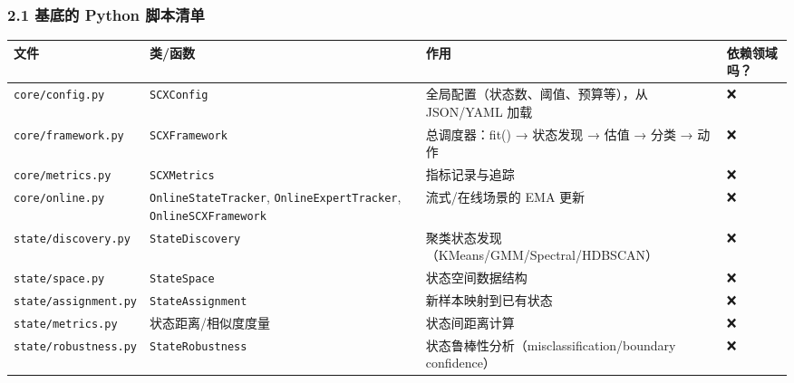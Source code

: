 \documentclass[
  12pt,
]{ctexart}
\begin{document}
\subsubsection{2.1 基底的 Python
脚本清单}\label{ux57faux5e95ux7684-python-ux811aux672cux6e05ux5355}

\begin{longtable}[]{@{}
  >{\raggedright\arraybackslash}p{}
  >{\raggedright\arraybackslash}p{}
  >{\raggedright\arraybackslash}p{}
  >{\centering\arraybackslash}p{}@{}}
\toprule\noalign{}
\begin{minipage}[b]{\linewidth}\raggedright
文件
\end{minipage} & \begin{minipage}[b]{\linewidth}\raggedright
类/函数
\end{minipage} & \begin{minipage}[b]{\linewidth}\raggedright
作用
\end{minipage} & \begin{minipage}[b]{\linewidth}\centering
依赖领域吗？
\end{minipage} \\
\midrule\noalign{}
\endhead
\bottomrule\noalign{}
\endlastfoot
\texttt{core/config.py} & \texttt{SCXConfig} &
全局配置（状态数、阈值、预算等），从 JSON/YAML 加载 & ❌ \\
\texttt{core/framework.py} & \texttt{SCXFramework} & 总调度器：fit() →
状态发现 → 估值 → 分类 → 动作 & ❌ \\
\texttt{core/metrics.py} & \texttt{SCXMetrics} & 指标记录与追踪 & ❌ \\
\texttt{core/online.py} & \texttt{OnlineStateTracker},
\texttt{OnlineExpertTracker}, \texttt{OnlineSCXFramework} &
流式/在线场景的 EMA 更新 & ❌ \\
\texttt{state/discovery.py} & \texttt{StateDiscovery} &
聚类状态发现（KMeans/GMM/Spectral/HDBSCAN） & ❌ \\
\texttt{state/space.py} & \texttt{StateSpace} & 状态空间数据结构 & ❌ \\
\texttt{state/assignment.py} & \texttt{StateAssignment} &
新样本映射到已有状态 & ❌ \\
\texttt{state/metrics.py} & 状态距离/相似度度量 & 状态间距离计算 & ❌ \\
\texttt{state/robustness.py} & \texttt{StateRobustness} &
状态鲁棒性分析（misclassification/boundary confidence） & ❌ \\

\end{longtable}
\end{document}
